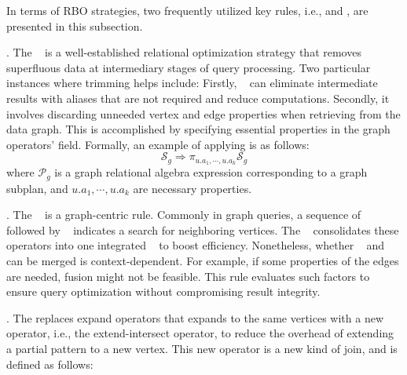 In terms of RBO strategies, two frequently utilized key rules, i.e., \trimrule and \fusionrule, are presented in this subsection.

\trimrule. 
The \trimrule~ is a well-established relational optimization strategy that removes superfluous data at intermediary stages of query processing. 
Two particular instances where trimming helps include: 
Firstly, \trimrule~ can eliminate intermediate results with aliases that are not required and reduce computations.
Secondly, it involves discarding unneeded vertex and edge properties when retrieving from the data graph. 
This is accomplished by specifying essential properties in the graph operators’  field.
Formally, an example of applying \trimrule is as follows:
\begin{equation}
    \mathcal{S}_g \Rightarrow \pi_{u.a_1, \cdots, u.a_k}\mathcal{S} _g 
\end{equation}
where $\mathcal{P}_g$ is a graph relational algebra expression corresponding to a graph subplan, and $u.a_1, \cdots, u.a_k$ are necessary properties.


\fusionrule. 
The \fusionrule~ is a graph-centric rule. 
Commonly in graph queries, a sequence of \expandedge~ followed by \getvertex~ indicates a search for neighboring vertices. 
The \fusionrule~ consolidates these operators into one integrated \expandvertex~ to boost efficiency. 
Nonetheless, whether \expandedge~ and \getvertex~ can be merged is context-dependent. 
For example, if some properties of the edges are needed, fusion might not be feasible.
This rule evaluates such factors to ensure query optimization without compromising result integrity.


\expandintersectrule.
The \expandintersectrule replaces expand operators that expands to the same vertices with a new operator, i.e., the extend-intersect operator, to reduce the overhead of extending a partial pattern to a new vertex.
This new operator is a new kind of join, and is defined as follows:

